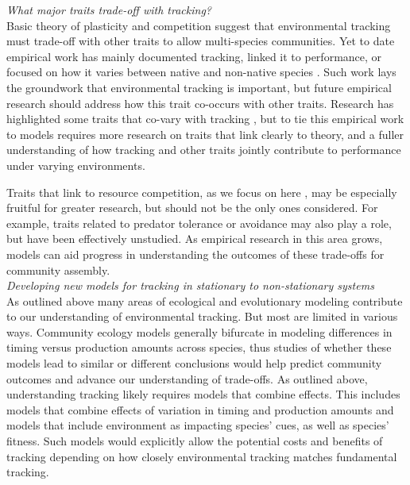 \documentclass[11pt,letterpaper]{article}
\begin{document}
\emph{What major traits trade-off with tracking?} \\ 
Basic theory of plasticity and competition suggest that environmental tracking must trade-off with other traits to allow multi-species communities. Yet to date empirical work has mainly documented tracking, linked it to performance, or focused on how it varies between native and non-native species \citep{Willis:2010al,wolkovichAmBot2013,Zettlemoyer2019}. Such work lays the groundwork that environmental tracking is important, but future empirical research should address how this trait co-occurs with other traits. Research has highlighted some traits that co-vary with tracking \citep[e.g.,][]{kharouba2014,lasky2016,Zhu2016BioLetters}, but to tie this empirical work to models requires more research on traits that link clearly to theory, and a fuller understanding of how tracking and other traits jointly contribute to performance under varying environments. 

Traits that link to resource competition, as we focus on here \citep[as others have as well, see][]{volkerass}, may be especially fruitful for greater research, but should not be the only ones considered. For example, traits related to predator tolerance or avoidance may also play a role, but have been effectively unstudied.  As empirical research in this area grows, models can aid progress in understanding the outcomes of these trade-offs for community assembly. \\ 

\emph{Developing new models for tracking in stationary to non-stationary systems} \\ 
As outlined above many areas of ecological and evolutionary modeling contribute to our understanding of environmental tracking. But most are limited in various ways. Community ecology models generally bifurcate in modeling differences in timing versus production amounts across species, thus studies of whether these models lead to similar or different conclusions would help predict community outcomes and advance our understanding of trade-offs. As outlined above, understanding tracking likely requires models that combine effects. This includes models that combine effects of variation in timing and production amounts and models that include environment as impacting species' cues, as well as species' fitness. Such models would explicitly allow the potential costs and benefits of tracking  depending on how closely environmental tracking matches fundamental tracking.
\end{document}
